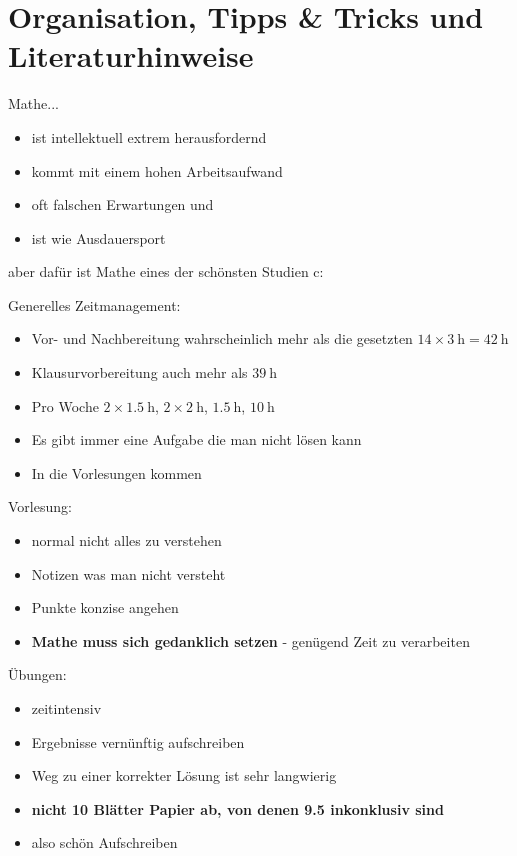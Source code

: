 \documentclass[consecutivenumbering]{gadsescript}
\begin{document}
\maketitle

\tableofcontents
\newpage

\section*{Organisation, Tipps \& Tricks und Literaturhinweise}

Mathe...
\begin{itemize}
	\item ist intellektuell extrem herausfordernd
	\item kommt mit einem hohen Arbeitsaufwand
	\item oft falschen Erwartungen und
	\item ist wie Ausdauersport
\end{itemize}

aber dafür ist Mathe eines der  schönsten Studien c:

Generelles Zeitmanagement:
\begin{itemize}
	\item Vor- und Nachbereitung wahrscheinlich mehr als die gesetzten $14 \times \qty{3}{\hour} = \qty{42}{\hour}$
	\item Klausurvorbereitung auch mehr als $\qty{39}{\hour}$
	\item Pro Woche $ 2 \times \qty{1.5}{\hour}$, $2 \times \qty{2}{\hour} $, $ \qty{1.5}{\hour} $, $ \qty{10}{\hour} $
	\item Es gibt immer eine Aufgabe die man nicht lösen kann
	\item In die Vorlesungen kommen
\end{itemize}

Vorlesung:
\begin{itemize}
	\item normal nicht alles zu verstehen
	\item Notizen was man nicht versteht
	\item Punkte konzise angehen
	\item \textbf{Mathe muss sich gedanklich setzen} - genügend Zeit zu verarbeiten
\end{itemize}

Übungen:
\begin{itemize}
	\item zeitintensiv
	\item Ergebnisse vernünftig aufschreiben
	\item Weg zu einer korrekter Lösung ist sehr langwierig
	\item \textbf{nicht 10 Blätter Papier ab, von denen 9.5 inkonklusiv sind}
	\item also schön Aufschreiben
\end{itemize}
\end{document}
